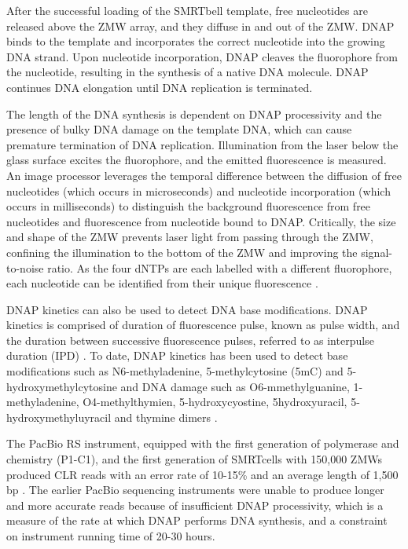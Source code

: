 After the successful loading of the SMRTbell template, free nucleotides are released above the ZMW array, and they diffuse in and out of the ZMW. DNAP binds to the template and incorporates the correct nucleotide into the growing DNA strand. Upon nucleotide incorporation, DNAP cleaves the fluorophore from the nucleotide, resulting in the synthesis of a native DNA molecule. DNAP continues DNA elongation until DNA replication is terminated.

The length of the DNA synthesis is dependent on DNAP processivity and the presence of bulky DNA damage on the template DNA, which can cause premature termination of DNA replication. Illumination from the laser below the glass surface excites the fluorophore, and the emitted fluorescence is measured. An image processor leverages the temporal difference between the diffusion of free nucleotides (which occurs in microseconds) and nucleotide incorporation (which occurs in milliseconds) to distinguish the background fluorescence from free nucleotides and fluorescence from nucleotide bound to DNAP. Critically, the size and shape of the ZMW prevents laser light from passing through the ZMW, confining the illumination to the bottom of the ZMW and improving the signal-to-noise ratio. As the four dNTPs are each labelled with a different fluorophore, each nucleotide can be identified from their unique fluorescence \cite{Eid2009-ol}. 

DNAP kinetics can also be used to detect DNA base modifications. DNAP kinetics is comprised of duration of fluorescence pulse, known as pulse width, and the duration between successive fluorescence pulses, referred to as interpulse duration (IPD) \cite{Flusberg2010-ub}. To date, DNAP kinetics has been used to detect base modifications such as N6-methyladenine, 5-methylcytosine (5mC) and 5-hydroxymethylcytosine \cite{Flusberg2010-ub} and DNA damage such as O6-mmethylguanine, 1-methyladenine, O4-methylthymien, 5-hydroxycyostine, 5hydroxyuracil, 5-hydroxymethyluyracil and thymine dimers \cite{Clark2011-jz}. 

The PacBio RS instrument, equipped with the first generation of polymerase and chemistry (P1-C1), and the first generation of SMRTcells with 150,000 ZMWs \cite{Rhoads2015-pk} produced CLR reads with an error rate of 10-15\% and an average length of 1,500 bp \cite{Eid2009-ol, Quail2012-cx}. The earlier PacBio sequencing instruments were unable to produce longer and more accurate reads because of insufficient DNAP processivity, which is a measure of the rate at which DNAP performs DNA synthesis, and a constraint on instrument running time of 20-30 hours. 

